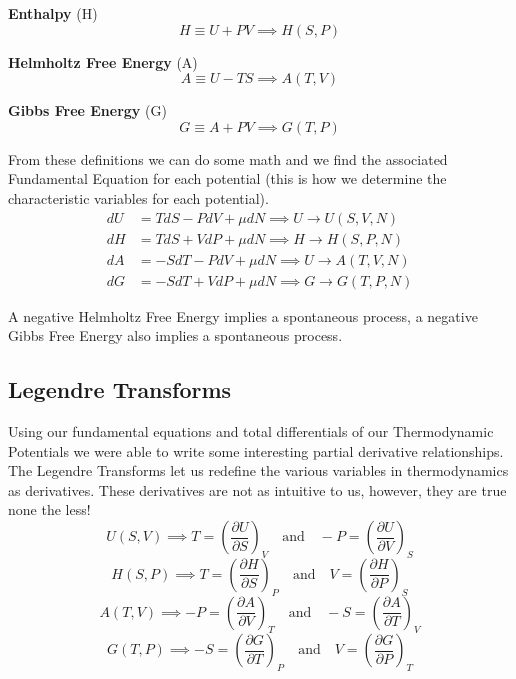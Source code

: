 \documentclass{article}
\begin{document}
\textbf{Enthalpy} (H)
\begin{equation}
H \equiv U + PV \implies H(S,P)
\end{equation}

\textbf{Helmholtz Free Energy} (A)
\begin{equation}
A \equiv U - TS \implies A(T,V)
\end{equation}

\textbf{Gibbs Free Energy} (G)
\begin{equation}
G \equiv A + PV \implies G(T,P)
\end{equation}

From these definitions we can do some math and we find the associated Fundamental Equation for each potential (this is how we determine the characteristic variables for each potential). 
\begin{equation}
\begin{split}
    dU &= TdS - PdV + \mu dN \implies U\rightarrow U(S,V,N) \\
    dH &= TdS + VdP + \mu dN \implies H\rightarrow H(S,P,N)\\
    dA &= -SdT - PdV + \mu dN \implies U\rightarrow A(T,V,N)\\
    dG &= -SdT + VdP + \mu dN \implies G\rightarrow G(T,P,N)
\end{split}
\end{equation}

A negative Helmholtz Free Energy implies a spontaneous process, a negative Gibbs Free Energy also implies a spontaneous process. 

\subsection{Legendre Transforms}
Using our fundamental equations and total differentials of our Thermodynamic Potentials we were able to write some interesting partial derivative relationships. 
The Legendre Transforms let us redefine the various variables in thermodynamics as derivatives.
These derivatives are not as intuitive to us, however, they are true none the less!
\begin{equation}
    U(S,V) \implies  T = \left(\frac{\partial U}{\partial S}\right)_V \quad \text{and} \quad -P = \left(\frac{\partial U}{\partial V}\right)_S
\end{equation}
\begin{equation}
H(S,P) \implies T= \left(\frac{\partial H}{\partial S}\right)_P \quad \text{and} \quad  V= \left(\frac{\partial H}{\partial P}\right)_S
\end{equation}
\begin{equation}
A(T,V) \implies   -P = \left(\frac{\partial A}{\partial V}\right)_T \quad \text{and} \quad  -S= \left(\frac{\partial A}{\partial T}\right)_V
\end{equation}
\begin{equation}
G(T,P) \implies -S= \left(\frac{\partial G}{\partial T}\right)_P \quad \text{and} \quad V = \left(\frac{\partial G}{\partial P}\right)_T
\end{equation}
\end{document}
